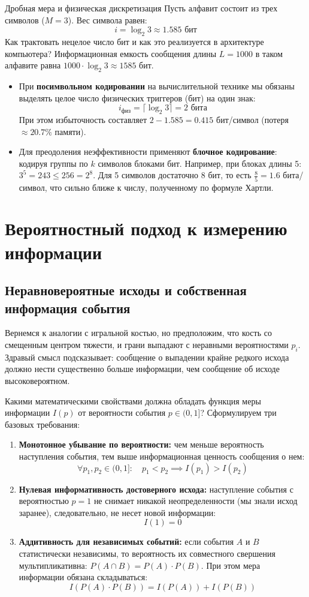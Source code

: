 \documentclass[11pt,a4paper]{article}
\begin{document}
\begin{questionbox}{Дробная мера и физическая дискретизация}
Пусть алфавит состоит из трех символов ($M = 3$). Вес символа равен:
$$i = \log_2 3 \approx 1.585 \text{ бит}$$
Как трактовать нецелое число бит и как это реализуется в архитектуре компьютера?
\tcblower
Информационная емкость сообщения длины $L = 1000$ в таком алфавите равна $1000 \cdot \log_2 3 \approx 1585$ бит. 
\begin{itemize}
    \item При \textbf{посимвольном кодировании} на вычислительной технике мы обязаны выделять целое число физических триггеров (бит) на один знак: 
    $$i_{\text{физ}} = \lceil \log_2 3 \rceil = 2 \text{ бита}$$ 
    При этом избыточность составляет $2 - 1.585 = 0.415$ бит/символ (потеря $\approx 20.7\%$ памяти).
    \item Для преодоления неэффективности применяют \textbf{блочное кодирование}: кодируя группы по $k$ символов блоками бит. Например, при блоках длины 5: $3^5 = 243 \le 256 = 2^8$. Для 5 символов достаточно 8 бит, то есть $\frac{8}{5} = 1.6$ бита/символ, что сильно ближе к числу, полученному по формуле Хартли.
\end{itemize}
\end{questionbox}

\section{Вероятностный подход к измерению информации}

\subsection{Неравновероятные исходы и собственная информация события}
Вернемся к аналогии с игральной костью, но предположим, что кость со смещенным центром тяжести, и грани выпадают с неравными вероятностями $p_i$. Здравый смысл подсказывает: сообщение о выпадении крайне редкого исхода должно нести существенно больше информации, чем сообщение об исходе высоковероятном.

Какими математическими свойствами должна обладать функция меры информации $I(p)$ от вероятности события $p \in (0, 1]$? Сформулируем три базовых требования:
\begin{enumerate}
    \item \textbf{Монотонное убывание по вероятности:} чем меньше вероятность наступления события, тем выше информационная ценность сообщения о нем:
    $$\forall p_1, p_2 \in (0, 1]: \quad p_1 < p_2 \implies I(p_1) > I(p_2)$$
    \item \textbf{Нулевая информативность достоверного исхода:} наступление события с вероятностью $p = 1$ не снимает никакой неопределенности (мы знали исход заранее), следовательно, не несет новой информации:
    $$I(1) = 0$$
    \item \textbf{Аддитивность для независимых событий:} если события $A$ и $B$ статистически независимы, то вероятность их совместного свершения мультипликативна: $P(A \cap B) = P(A) \cdot P(B)$. При этом мера информации обязана складываться:
    $$I(P(A) \cdot P(B)) = I(P(A)) + I(P(B))$$
\end{enumerate}
\end{document}
